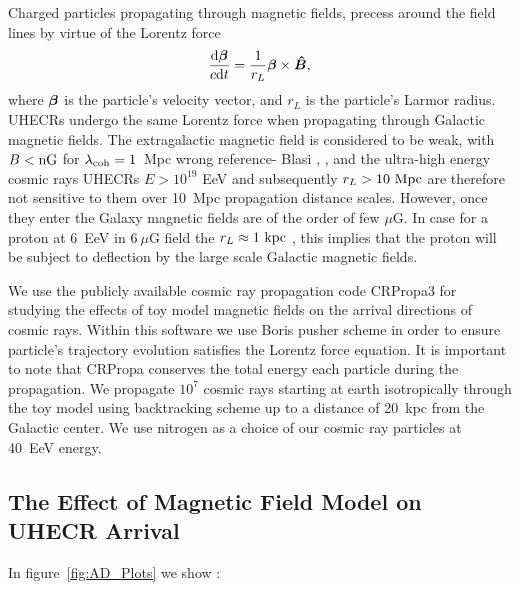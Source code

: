 \documentclass[usenatbib]{mnras}
\newcommand{\Andrew}[1]{\textcolor{dg}{#1}}
\newcommand{\bfm}[1]{\mbox{\boldmath$ #1 $}}
\begin{document}
Charged particles propagating through magnetic fields, precess around the field lines by virtue of the Lorentz force 
\begin{eqnarray}
\frac{{\rm d}\bfm{\beta}}{c{\rm d}t} = \frac{1}{r_{L}}\bfm{\beta}\times \bfm{\hat{B}}, 
\end{eqnarray}
where $\bfm{\beta}$ is the particle's velocity vector, and $r_{L}$ is the particle's Larmor radius. UHECRs undergo the same Lorentz force when propagating through Galactic magnetic fields. The extragalactic magnetic field is considered to be weak, with $B < \rm {nG}$ for $\lambda_{\rm coh}=1$~Mpc \cite{Blasi} \Andrew{wrong reference- Blasi }, \cite{Kronberg_2007}, and the ultra-high energy cosmic rays UHECRs $E > 10^{19}$ EeV and subsequently $r_{L}>{\rm 10~Mpc}$ are therefore not sensitive to them over 10~Mpc propagation distance scales. However, once they enter the Galaxy magnetic fields are of the order of few $\mu$G. In case for a proton at 6~EeV in $6~\mu$G field the $r_L \approx 1 ~ \rm kpc$ , this implies that the proton will be subject to deflection by the large scale Galactic magnetic fields.

We use the publicly available cosmic ray propagation code CRPropa3 \cite{CRPropa3_2016} for studying the effects of toy model magnetic fields on the arrival directions of cosmic rays. Within this software we use Boris pusher scheme in order to ensure particle's trajectory evolution satisfies the Lorentz force equation. It is important to note that CRPropa conserves the total energy each particle during the propagation.
We propagate $10^7$ cosmic rays starting at earth isotropically through the toy model using backtracking scheme up to a distance of 20~kpc from the Galactic center. We use nitrogen as a choice of our cosmic ray particles at 40~EeV energy. 

\subsection{The Effect of Magnetic Field Model on UHECR Arrival}

In figure~\ref{fig:AD_Plots} we show :
\end{document}
